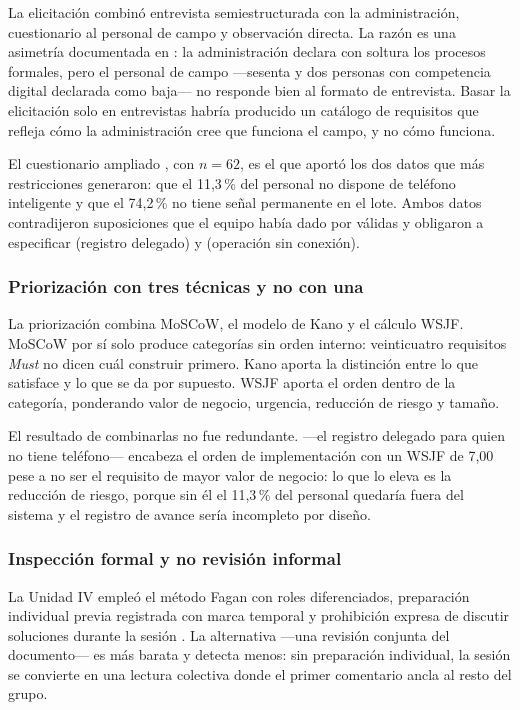 La elicitación combinó entrevista semiestructurada con la administración, cuestionario al personal de
campo y observación directa. La razón es una asimetría documentada en : la administración
declara con soltura los procesos formales, pero el personal de campo ---sesenta y dos personas con
competencia digital declarada como baja--- no responde bien al formato de entrevista. Basar la
elicitación solo en entrevistas habría producido un catálogo de requisitos que refleja cómo la
administración cree que funciona el campo, y no cómo funciona.

El cuestionario ampliado , con $n=62$, es el que aportó los dos datos que más restricciones
generaron: que el 11,3\,\% del personal no dispone de teléfono inteligente y que el 74,2\,\% no tiene
señal permanente en el lote. Ambos datos contradijeron suposiciones que el equipo había dado por
válidas y obligaron a especificar  (registro delegado) y  (operación sin
conexión).

\subsubsection*{Priorización con tres técnicas y no con una}

La priorización combina MoSCoW, el modelo de Kano y el cálculo WSJF. MoSCoW por sí solo produce
categorías sin orden interno: veinticuatro requisitos \emph{Must} no dicen cuál construir primero.
Kano aporta la distinción entre lo que satisface y lo que se da por supuesto. WSJF aporta el orden
dentro de la categoría, ponderando valor de negocio, urgencia, reducción de riesgo y tamaño.

El resultado de combinarlas no fue redundante.  ---el registro delegado para quien no tiene
teléfono--- encabeza el orden de implementación con un WSJF de 7,00 pese a no ser el requisito de
mayor valor de negocio: lo que lo eleva es la reducción de riesgo, porque sin él el 11,3\,\% del
personal quedaría fuera del sistema y el registro de avance sería incompleto por diseño.

\subsubsection*{Inspección formal y no revisión informal}

La Unidad IV empleó el método Fagan con roles diferenciados, preparación individual previa registrada
con marca temporal y prohibición expresa de discutir soluciones durante la sesión \cite{fagan1976}.
La alternativa ---una revisión conjunta del documento--- es más barata y detecta menos: sin
preparación individual, la sesión se convierte en una lectura colectiva donde el primer comentario
ancla al resto del grupo.

